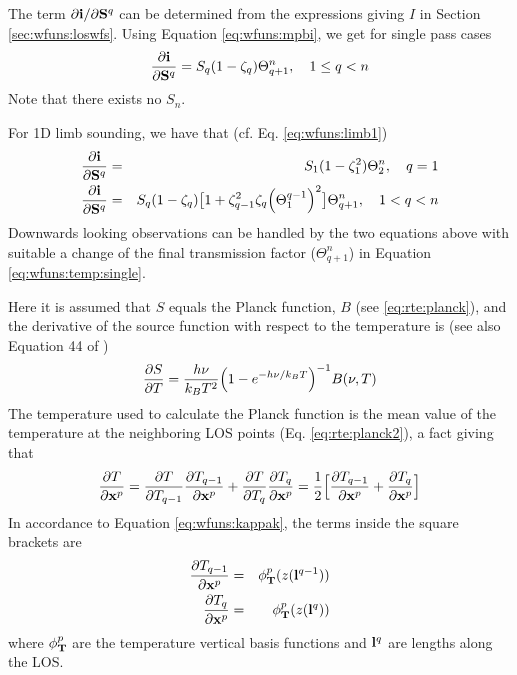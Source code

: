  The term $\partial \mathbf{i}/\partial \mathbf{S}^q$ can be determined from the
 expressions giving $I$ in Section \ref{sec:wfuns:loswfs}. Using
 Equation \ref{eq:wfuns:mpbi}, we get for single pass cases
 \begin{eqnarray}
   \frac{\partial \mathbf{i}}{\partial \mathbf{S}^q} = 
                  S_q(1-\zeta_q)\Theta^n_{q+1}, \quad 1\leq q<n 
  \label{eq:wfuns:temp:single}
 \end{eqnarray}
 Note that there exists no $S_n$.

 For 1D limb sounding, we have that (cf. Eq. \ref{eq:wfuns:limb1})
 \begin{eqnarray}
   \frac{\partial \mathbf{i}}{\partial \mathbf{S}^q} & = & 
       S_1(1-\zeta_1^2)\Theta^n_{2}, \quad q=1  \nonumber \\
   \frac{\partial \mathbf{i}}{\partial \mathbf{S}^q} & = & S_q(1-\zeta_q)\big[ 1+\zeta_{q-1}^2\zeta_q\Big(\Theta^{q-1}_{1}\Big)^2  \big]\Theta^n_{q+1}, \quad 1< q<n 
 \end{eqnarray}
 Downwards looking observations can be handled by the two equations above 
 with suitable a change of the final transmission factor ($\Theta^n_{q+1}$) 
 in Equation \ref{eq:wfuns:temp:single}. 
 
 Here it is assumed that $S$ equals the Planck function, $B$ (see
 \ref{eq:rte:planck}), and the derivative of the source function with
 respect to the temperature is (see also Equation 44 of
 \citet{eriksson:00a})
 \begin{equation}
   \frac{\partial S}{\partial T} = \frac{h\nu}{k_BT^2}
        \Big( 1-e^{-h\nu/k_BT}  \Big)^{-1}B(\nu,T)
 \end{equation}
 The temperature used to calculate the Planck function is the mean
 value of the temperature at the neighboring LOS points (Eq.
 \ref{eq:rte:planck2}), a fact giving that
 \begin{equation}
   \frac{\partial T}{\partial \mathbf{x}^p} = 
         \frac{\partial T}{\partial T_{q-1}}
         \frac{\partial T_{q-1}}{\partial \mathbf{x}^p} +
         \frac{\partial T}{\partial T_q}
         \frac{\partial T_q}{\partial \mathbf{x}^p} = \frac{1}{2} \Big[
         \frac{\partial T_{q-1}}{\partial \mathbf{x}^p} +
         \frac{\partial T_q}{\partial \mathbf{x}^p} \Big]
 \end{equation}
 In accordance to Equation \ref{eq:wfuns:kappak}, the terms inside the
 square brackets are
 \begin{eqnarray}
    \frac{\partial T_{q-1}}{\partial \mathbf{x}^p} &=&  \phi^p_{\mathbf{T}}(z(\mathbf{l}^{q-1})) \\
    \frac{\partial T_q}{\partial \mathbf{x}^p} &=&  \phi^p_{\mathbf{T}}(z(\mathbf{l}^q))
 \end{eqnarray}
 where $\phi^p_{\mathbf{T}}$ are the temperature vertical basis functions and 
 $\mathbf{l}^q$ are lengths along the LOS.  
  

